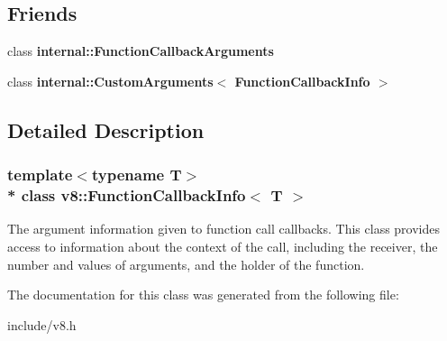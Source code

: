 \subsection*{Friends}
\begin{DoxyCompactItemize}
\item 
class {\bfseries internal\+::\+Function\+Callback\+Arguments}\hypertarget{classv8_1_1_function_callback_info_aac7268b20857fd75b69b86ded46d0f34}{}\label{classv8_1_1_function_callback_info_aac7268b20857fd75b69b86ded46d0f34}

\item 
class {\bfseries internal\+::\+Custom\+Arguments$<$ Function\+Callback\+Info $>$}\hypertarget{classv8_1_1_function_callback_info_a02d869d89b14ddd1717429c2106f955a}{}\label{classv8_1_1_function_callback_info_a02d869d89b14ddd1717429c2106f955a}

\end{DoxyCompactItemize}


\subsection{Detailed Description}
\subsubsection*{template$<$typename T$>$\\*
class v8\+::\+Function\+Callback\+Info$<$ T $>$}

The argument information given to function call callbacks. This class provides access to information about the context of the call, including the receiver, the number and values of arguments, and the holder of the function. 

The documentation for this class was generated from the following file\+:\begin{DoxyCompactItemize}
\item 
include/v8.\+h\end{DoxyCompactItemize}
